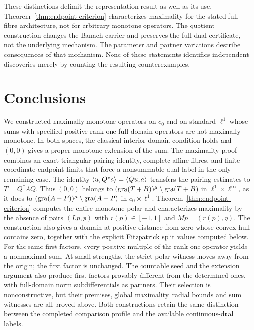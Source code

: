 These distinctions delimit the representation result as well as its
use. Theorem~\ref{thm:endpoint-criterion} characterizes maximality for
the stated full-fibre architecture, not for arbitrary monotone operators.
The quotient construction changes the Banach carrier and preserves the
full-dual certificate, not the underlying mechanism. The parameter and
partner variations describe consequences of that mechanism. None of
these statements identifies independent discoveries merely by counting
the resulting counterexamples.



\section{Conclusions}
\label{sec:conclusion}

We constructed maximally monotone operators on $c_0$ and on standard
$\ell^1$ whose sums with specified positive rank-one full-domain
operators are not maximally monotone. In both spaces, the classical
interior-domain condition holds and $(0,0)$ gives a proper monotone
extension of the sum. The maximality proof combines an exact triangular
pairing identity, complete affine fibres, and finite-coordinate endpoint
limits that force a nonsummable dual label in the only remaining case.
The identity $\langle u,Q^*a\rangle=\langle Qu,a\rangle$ transfers the pairing estimates
to $T=Q^*AQ$. Thus $(0,0)$ belongs to
$(\operatorname{gra}(T+B))^\mu\setminus\operatorname{gra}(T+B)$ in $\ell^1\times\ell^\infty$,
as it does to $(\operatorname{gra}(A+P))^\mu\setminus\operatorname{gra}(A+P)$ in $c_0\times\ell^1$. Theorem~\ref{thm:endpoint-criterion} computes the entire monotone polar
and characterizes maximality by the absence of pairs $(Lp,p)$ with
$r(p)\in[-1,1]$ and $Mp=(r(p),\eta)$. The construction also gives a domain at
positive distance from zero whose convex hull contains zero, together
with the explicit Fitzpatrick split values computed below.
For the same first factors, every positive multiple of the rank-one
operator yields a nonmaximal sum. At small strengths, the strict polar
witness moves away from the origin; the first factor is unchanged.
The countable seed and the extension argument also produce first factors
provably different from the determined ones, with full-domain norm
subdifferentials as partners. Their selection is nonconstructive, but
their premises, global maximality, radial bounds and sum witnesses are
all proved above. Both constructions retain the same distinction between
the completed comparison profile and the available continuous-dual labels.



